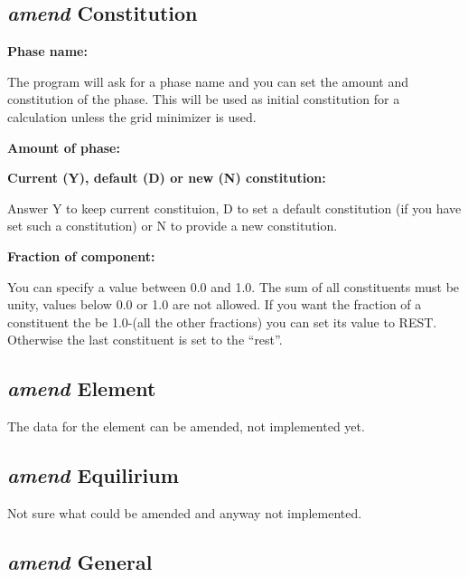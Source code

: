 \documentclass[11pt]{article}
\begin{document}
\hypertarget{Amend constitution}{}
\subsection{{\em amend} Constitution}


\hypertarget{Amend const phase name}{{\bf Phase name:}}

The program will ask for a phase name and you can set the amount
and constitution of the phase.  This will be used as initial
constitution for a calculation unless the grid minimizer is used.

\hypertarget{Amend const amount}{{\bf Amount of phase:}}


{\bf Current (Y), default (D) or new (N) constitution:}

Answer Y to keep current constituion, D to set a default constitution
(if you have set such a constitution) or N to provide a new
constitution.

{\bf Fraction of component: }

You can specify a value between 0.0 and 1.0.  The sum of all
constituents must be unity, values below 0.0 or 1.0 are not allowed.
If you want the fraction of a constituent the be 1.0-(all the other
fractions) you can set its value to REST.  Otherwise the last
constituent is set to the ``rest''.

\hypertarget{Amend element}{}
\subsection{{\em amend} Element}

The data for the element can be amended, not implemented yet.

\hypertarget{Amend equilibrium}{}
\subsection{{\em amend} Equilirium}

Not sure what could be amended and anyway not implemented.

\hypertarget{Amend general}{}
\subsection{{\em amend} General}
\end{document}
